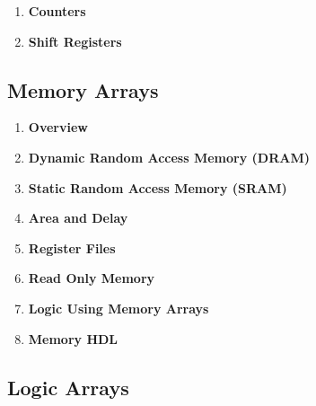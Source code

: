 \documentclass[12pt]{article}
\begin{document}
\begin{enumerate}
  \item \textbf{Counters}

  \item \textbf{Shift Registers}
\end{enumerate}

\subsection{Memory Arrays}

\begin{enumerate}
  \item \textbf{Overview}

  \item \textbf{Dynamic Random Access Memory (DRAM)}

  \item \textbf{Static Random Access Memory (SRAM)}

  \item \textbf{Area and Delay}

  \item \textbf{Register Files}

  \item \textbf{Read Only Memory}

  \item \textbf{Logic Using Memory Arrays}

  \item \textbf{Memory HDL}
\end{enumerate}

\subsection{Logic Arrays}
\end{document}
